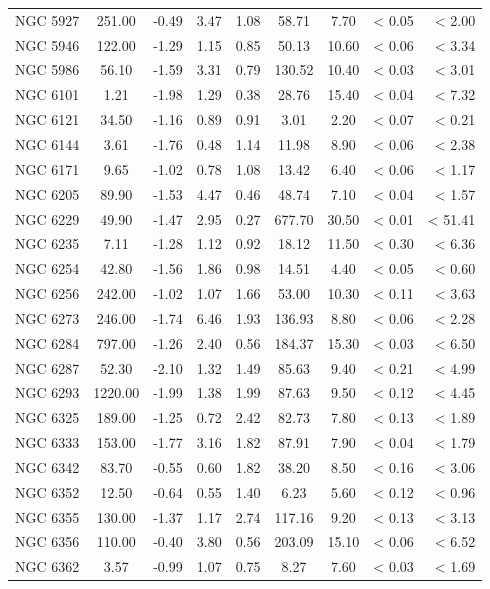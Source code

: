 \documentclass[doublespace,draft,nopageskip]{VTthesis} %
\begin{document}
\begin{appendices}
\begin{table}
\begin{tabular}{lcccccccr}
NGC 5927 & 251.00 & -0.49 & 3.47 & 1.08 & 58.71 & 7.70 & < 0.05 & < 2.00\\
NGC 5946 & 122.00 & -1.29 & 1.15 & 0.85 & 50.13 & 10.60 & < 0.06 & < 3.34\\
NGC 5986 & 56.10 & -1.59 & 3.31 & 0.79 & 130.52 & 10.40 & < 0.03 & < 3.01\\
NGC 6101 & 1.21 & -1.98 & 1.29 & 0.38 & 28.76 & 15.40 & < 0.04 & < 7.32\\
NGC 6121 & 34.50 & -1.16 & 0.89 & 0.91 & 3.01 & 2.20 & < 0.07 & < 0.21\\
NGC 6144 & 3.61 & -1.76 & 0.48 & 1.14 & 11.98 & 8.90 & < 0.06 & < 2.38\\
NGC 6171 & 9.65 & -1.02 & 0.78 & 1.08 & 13.42 & 6.40 & < 0.06 & < 1.17\\
NGC 6205 & 89.90 & -1.53 & 4.47 & 0.46 & 48.74 & 7.10 & < 0.04 & < 1.57\\
NGC 6229 & 49.90 & -1.47 & 2.95 & 0.27 & 677.70 & 30.50 & < 0.01 & < 51.41\\
NGC 6235 & 7.11 & -1.28 & 1.12 & 0.92 & 18.12 & 11.50 & < 0.30 & < 6.36\\
NGC 6254 & 42.80 & -1.56 & 1.86 & 0.98 & 14.51 & 4.40 & < 0.05 & < 0.60\\
NGC 6256 & 242.00 & -1.02 & 1.07 & 1.66 & 53.00 & 10.30 & < 0.11 & < 3.63\\
NGC 6273 & 246.00 & -1.74 & 6.46 & 1.93 & 136.93 & 8.80 & < 0.06 & < 2.28\\
NGC 6284 & 797.00 & -1.26 & 2.40 & 0.56 & 184.37 & 15.30 & < 0.03 & < 6.50\\
NGC 6287 & 52.30 & -2.10 & 1.32 & 1.49 & 85.63 & 9.40 & < 0.21 & < 4.99\\
NGC 6293 & 1220.00 & -1.99 & 1.38 & 1.99 & 87.63 & 9.50 & < 0.12 & < 4.45\\
NGC 6325 & 189.00 & -1.25 & 0.72 & 2.42 & 82.73 & 7.80 & < 0.13 & < 1.89\\
NGC 6333 & 153.00 & -1.77 & 3.16 & 1.82 & 87.91 & 7.90 & < 0.04 & < 1.79\\
NGC 6342 & 83.70 & -0.55 & 0.60 & 1.82 & 38.20 & 8.50 & < 0.16 & < 3.06\\
NGC 6352 & 12.50 & -0.64 & 0.55 & 1.40 & 6.23 & 5.60 & < 0.12 & < 0.96\\
NGC 6355 & 130.00 & -1.37 & 1.17 & 2.74 & 117.16 & 9.20 & < 0.13 & < 3.13\\
NGC 6356 & 110.00 & -0.40 & 3.80 & 0.56 & 203.09 & 15.10 & < 0.06 & < 6.52\\
NGC 6362 & 3.57 & -0.99 & 1.07 & 0.75 & 8.27 & 7.60 & < 0.03 & < 1.69\\
\hline
\end{tabular}
\end{table}


\end{appendices}
\end{document}
